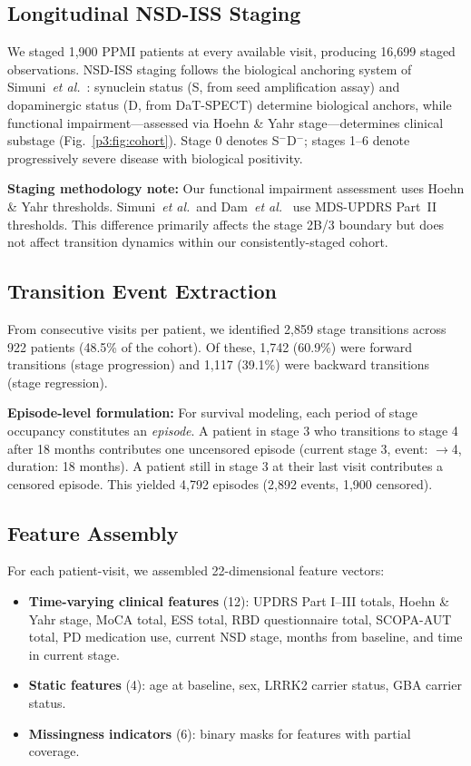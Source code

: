 \subsection{Longitudinal NSD-ISS Staging}
\label{p3:sec:staging}

We staged 1,900 PPMI patients at every available visit, producing 16,699 staged observations. NSD-ISS staging follows the biological anchoring system of Simuni~\textit{et al.}~\cite{simuni2024}: synuclein status (S, from seed amplification assay) and dopaminergic status (D, from DaT-SPECT) determine biological anchors, while functional impairment---assessed via Hoehn \& Yahr stage---determines clinical substage (Fig.~\ref{p3:fig:cohort}). Stage 0 denotes S$^{-}$D$^{-}$; stages 1--6 denote progressively severe disease with biological positivity.

\textbf{Staging methodology note:} Our functional impairment assessment uses Hoehn \& Yahr thresholds. Simuni~\textit{et al.}\ and Dam~\textit{et al.}~\cite{dam2024} use MDS-UPDRS Part~II thresholds. This difference primarily affects the stage 2B/3 boundary but does not affect transition dynamics within our consistently-staged cohort.

\subsection{Transition Event Extraction}
\label{p3:sec:transitions}

From consecutive visits per patient, we identified 2,859 stage transitions across 922 patients (48.5\% of the cohort). Of these, 1,742 (60.9\%) were forward transitions (stage progression) and 1,117 (39.1\%) were backward transitions (stage regression).

\textbf{Episode-level formulation:} For survival modeling, each period of stage occupancy constitutes an \textit{episode}. A patient in stage 3 who transitions to stage 4 after 18 months contributes one uncensored episode (current stage 3, event: $\to$4, duration: 18 months). A patient still in stage 3 at their last visit contributes a censored episode. This yielded 4,792 episodes (2,892 events, 1,900 censored).

\subsection{Feature Assembly}
\label{p3:sec:features}

For each patient-visit, we assembled 22-dimensional feature vectors:
\begin{itemize}
    \item \textbf{Time-varying clinical features} (12): UPDRS Part I--III totals, Hoehn \& Yahr stage, MoCA total, ESS total, RBD questionnaire total, SCOPA-AUT total, PD medication use, current NSD stage, months from baseline, and time in current stage.
    \item \textbf{Static features} (4): age at baseline, sex, LRRK2 carrier status, GBA carrier status.
    \item \textbf{Missingness indicators} (6): binary masks for features with partial coverage.
\end{itemize}


